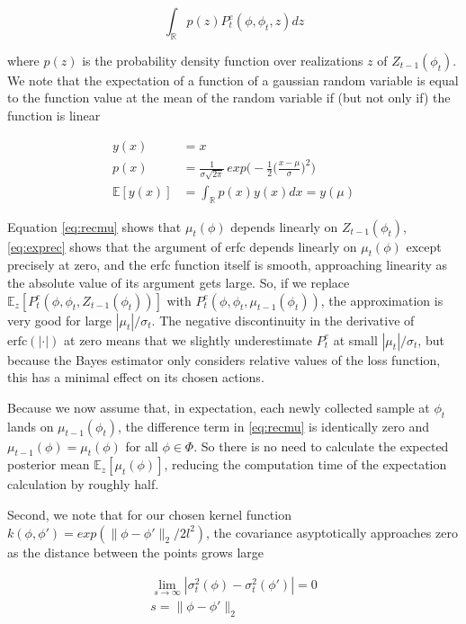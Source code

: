 \documentclass{amsart}
\begin{document}
\begin{equation}
    \int_\mathbb{R}p(z)P_t^e(\phi,\phi_t,z)dz
\end{equation}
\smallskip

where $p(z)$ is the probability density function over realizations $z$ of $Z_{t-1}(\phi_t)$. We note that the expectation of a function of a gaussian random variable is equal to the function value at the mean of the random variable if (but not only if) the function is linear

\begin{align}
    y(x)&=x \nonumber \\
    p(x)&= \frac{1}{\sigma \sqrt{2\pi}}\,exp\Big(-\frac{1}{2}\big(\frac{x-\mu}{\sigma}\big)^2\Big)\nonumber \\
    \mathbb{E}[y(x)]& = \int_\mathbb{R}p(x)y(x)dx = y(\mu)
\end{align}
\smallskip

Equation \eqref{eq:recmu} shows that $\mu_t(\phi)$ depends linearly on $Z_{t-1}(\phi_t)$, \eqref{eq:exprec} shows that the argument of erfc depends linearly on $\mu_t(\phi)$ except precisely at zero, and the erfc function itself is smooth, approaching linearity as the absolute value of its argument gets large. So, if we replace $\mathbb{E}_{z}[P_t^e(\phi,\phi_t,Z_{t-1}(\phi_t))]$ with $P_t^e(\phi,\phi_t,\mu_{t-1}(\phi_t))$, the approximation is very good for large $|\mu_t|/\sigma_t$. The negative discontinuity in the derivative of $\text{erfc}(|\cdot|)$ at zero means that we slightly underestimate $P_t^e$ at small $|\mu_t|/\sigma_t$, but because the Bayes estimator only considers relative values of the loss function, this has a minimal effect on its chosen actions.

Because we now assume that, in expectation, each newly collected sample at $\phi_t$ lands on $\mu_{t-1}(\phi_t)$, the difference term in \eqref{eq:recmu} is identically zero and $\mu_{t-1}(\phi)=\mu_t(\phi)$ for all $\phi\in\Phi$. So there is no need to calculate the expected posterior mean $\mathbb{E}_z[\mu_t(\phi)]$, reducing the computation time of the expectation calculation by roughly half.

Second, we note that for our chosen kernel function $k(\phi,\phi')=exp(\|\phi-\phi'\|_2/2l^2)$, the covariance asyptotically approaches zero as the distance between the points grows large

\begin{align}
    \lim_{s\rightarrow\infty} |\sigma_t^2(\phi)-\sigma_t^2(\phi')|=0 \\
    s = \|\phi-\phi'\|_2 \nonumber
\end{align}
\end{document}
